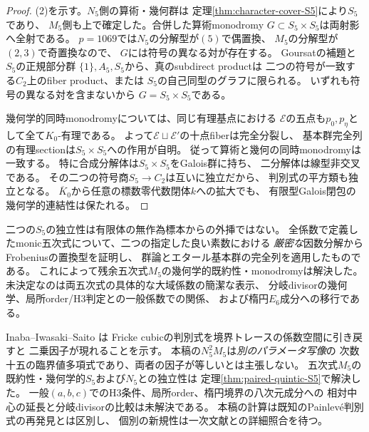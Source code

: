 \begin{proof}
(2)を示す。$N_5$側の算術・幾何群は
定理\ref{thm:character-cover-S5}により$S_5$であり、
$M_5$側も上で確定した。合併した算術monodromy
$G\subset S_5\times S_5$は両射影へ全射である。
$p=1069$では$N_5$の分解型が$(5)$で偶置換、
$M_5$の分解型が$(2,3)$で奇置換なので、
$G$には符号の異なる対が存在する。
Goursatの補題と$S_5$の正規部分群
$\{1\},A_5,S_5$から、真のsubdirect productは
二つの符号が一致する$C_2$上のfiber product、または
$S_5$の自己同型のグラフに限られる。
いずれも符号の異なる対を含まないから
$G=S_5\times S_5$である。

幾何学的同時monodromyについては、同じ有理基点における
$\mathcal E$の五点も$p_0,p_\eta$として全て$K_0$-有理である。
よって$\mathcal E\sqcup\mathcal E'$の十点fiberは完全分裂し、
基本群完全列の有理sectionは$S_5\times S_5$への作用が自明。
従って算術と幾何の同時monodromyは一致する。
特に合成分解体は$S_5\times S_5$をGalois群に持ち、
二分解体は線型非交叉である。
その二つの符号商$S_5\to C_2$は互いに独立だから、
判別式の平方類も独立となる。
$\overline K_0$から任意の標数零代数閉体$k$への拡大でも、
有限型Galois閉包の幾何学的連結性は保たれる。
\end{proof}

\begin{remark}[計算の意味と未解決事項]
二つの$S_5$の独立性は有限体の無作為標本からの外挿ではない。
全係数で定義したmonic五次式について、二つの指定した良い素数における
\emph{厳密な}因数分解からFrobeniusの置換型を証明し、
群論とエタール基本群の完全列を適用したものである。
これによって残余五次式$M_5$の幾何学的既約性・monodromyは解決した。
未決定なのは両五次式の具体的な大域係数の簡潔な表示、
分岐divisorの幾何学、局所order/H3判定との一般係数での関係、
および楕円$E_6$成分への移行である。
\end{remark}

\begin{remark}
Inaba--Iwasaki--Saito \cite[\S9.1, Definition 9.1]{IISDiscriminant}は
Fricke cubicの判別式を境界トレースの係数空間に引き戻すと
二乗因子が現れることを示す。
本稿の$N_5^2M_5$は\emph{別のパラメータ写像}の
次数十五の臨界値多項式であり、両者の因子が等しいとは主張しない。
五次式$M_5$の既約性・幾何学的$S_5$および$N_5$との独立性は
定理\ref{thm:paired-quintic-S5}で解決した。
一般$(a,b,c)$でのH3条件、局所order、楕円境界の八次元成分への
相対中心の延長と分岐divisorの比較は未解決である。
本稿の計算は既知のPainlev\'{e}判別式の再発見とは区別し、
個別の新規性は一次文献との詳細照合を待つ。
\end{remark}
